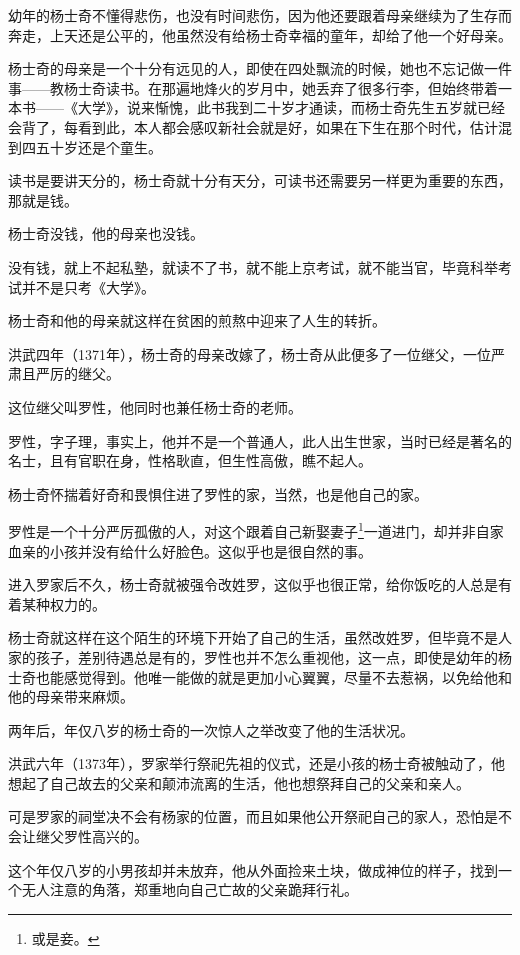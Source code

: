 \begin{multicols}{\theparacolNo}
幼年的杨士奇不懂得悲伤，也没有时间悲伤，因为他还要跟着母亲继续为了生存而奔走，上天还是公平的，他虽然没有给杨士奇幸福的童年，却给了他一个好母亲。

杨士奇的母亲是一个十分有远见的人，即使在四处飘流的时候，她也不忘记做一件事——教杨士奇读书。在那遍地烽火的岁月中，她丢弃了很多行李，但始终带着一本书——《大学》，说来惭愧，此书我到二十岁才通读，而杨士奇先生五岁就已经会背了，每看到此，本人都会感叹新社会就是好，如果在下生在那个时代，估计混到四五十岁还是个童生。

读书是要讲天分的，杨士奇就十分有天分，可读书还需要另一样更为重要的东西，那就是钱。

杨士奇没钱，他的母亲也没钱。

没有钱，就上不起私塾，就读不了书，就不能上京考试，就不能当官，毕竟科举考试并不是只考《大学》。

杨士奇和他的母亲就这样在贫困的煎熬中迎来了人生的转折。

洪武四年（1371年），杨士奇的母亲改嫁了，杨士奇从此便多了一位继父，一位严肃且严厉的继父。

这位继父叫罗性，他同时也兼任杨士奇的老师。

罗性，字子理，事实上，他并不是一个普通人，此人出生世家，当时已经是著名的名士，且有官职在身，性格耿直，但生性高傲，瞧不起人。

杨士奇怀揣着好奇和畏惧住进了罗性的家，当然，也是他自己的家。

罗性是一个十分严厉孤傲的人，对这个跟着自己新娶妻子\footnote{或是妾。}一道进门，却并非自家血亲的小孩并没有给什么好脸色。这似乎也是很自然的事。

进入罗家后不久，杨士奇就被强令改姓罗，这似乎也很正常，给你饭吃的人总是有着某种权力的。

杨士奇就这样在这个陌生的环境下开始了自己的生活，虽然改姓罗，但毕竟不是人家的孩子，差别待遇总是有的，罗性也并不怎么重视他，这一点，即使是幼年的杨士奇也能感觉得到。他唯一能做的就是更加小心翼翼，尽量不去惹祸，以免给他和他的母亲带来麻烦。

两年后，年仅八岁的杨士奇的一次惊人之举改变了他的生活状况。

洪武六年（1373年），罗家举行祭祀先祖的仪式，还是小孩的杨士奇被触动了，他想起了自己故去的父亲和颠沛流离的生活，他也想祭拜自己的父亲和亲人。

可是罗家的祠堂决不会有杨家的位置，而且如果他公开祭祀自己的家人，恐怕是不会让继父罗性高兴的。

这个年仅八岁的小男孩却并未放弃，他从外面捡来土块，做成神位的样子，找到一个无人注意的角落，郑重地向自己亡故的父亲跪拜行礼。


\end{multicols}

